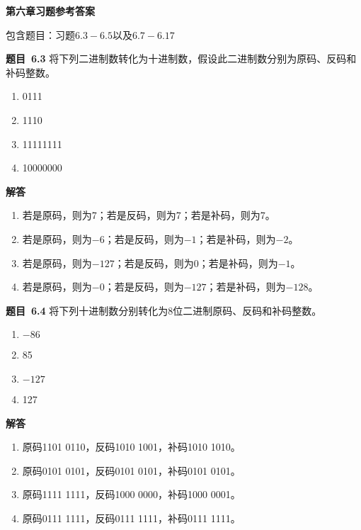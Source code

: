 \documentclass[10pt,a4paper,UTF8]{ctexart}
\newcommand{\problemname}{待定义}
\newenvironment{problem}{\begin{shaded}\par\noindent\textbf{题目\  \problemname}}{\end{shaded}\par}
\newenvironment{solution}{\par\noindent\textbf{解答}\ }{\par}
\begin{document}
\begin{center}
\LARGE\textbf{第六章习题参考答案}
\end{center}

{\kaishu 包含题目：习题$6.3-6.5$以及$6.7-6.17$}

\renewcommand{\problemname}{6.3}
\begin{problem}
	将下列二进制数转化为十进制数，假设此二进制数分别为原码、反码和补码整数。
	\begin{enumerate}[(1)]
		\item 0111
		\item 1110
		\item 11111111
		\item 10000000
	\end{enumerate}
\end{problem}

\begin{solution}
	\begin{enumerate}[(1)]
		\item 若是原码，则为7；若是反码，则为7；若是补码，则为7。
		\item 若是原码，则为$-6$；若是反码，则为$-1$；若是补码，则为$-2$。
		\item 若是原码，则为$-127$；若是反码，则为0；若是补码，则为$-1$。
		\item 若是原码，则为$-0$；若是反码，则为$-127$；若是补码，则为$-128$。
	\end{enumerate}
\end{solution}


\renewcommand{\problemname}{6.4}
\begin{problem}
	将下列十进制数分别转化为8位二进制原码、反码和补码整数。
	\begin{enumerate}[(1)]
		\item $-86$
		\item 85
		\item $-127$
		\item 127
	\end{enumerate}
\end{problem}

\begin{solution}
	\begin{enumerate}[(1)]
		\item 原码1101 0110，反码1010 1001，补码1010 1010。
		\item 原码0101 0101，反码0101 0101，补码0101 0101。
		\item 原码1111 1111，反码1000 0000，补码1000 0001。
		\item 原码0111 1111，反码0111 1111，补码0111 1111。
	\end{enumerate}
	
\end{solution}
\end{document}
